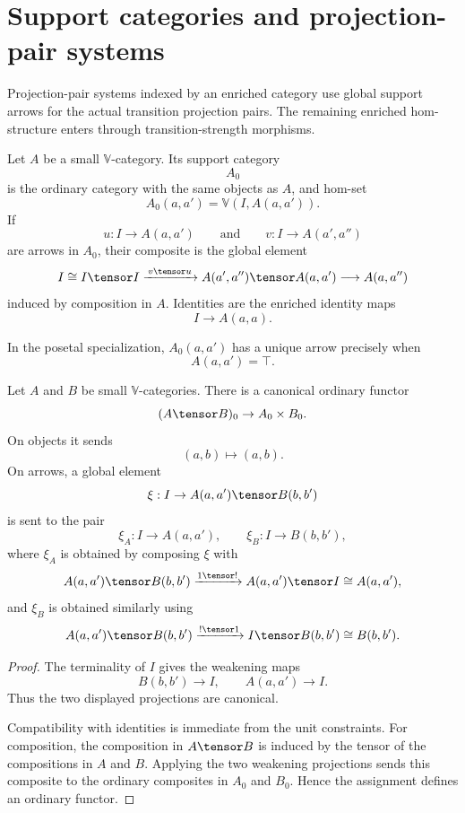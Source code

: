 \section{Support categories and projection-pair systems}
\label{sec:support-categories-split-systems}

Projection-pair systems indexed by an enriched category use global support
arrows for the actual transition projection pairs.  The remaining enriched
hom-structure enters through transition-strength morphisms.

\begin{definition}
\label{def:support-category-enriched-index}
Let \(A\) be a small \(\mathbb V\)-category.  Its support category
\[
    A_0
\]
is the ordinary category with the same objects as \(A\), and hom-set
\[
    A_0(a,a')=\mathbb V(I,A(a,a')).
\]
If
\[
    u:I\to A(a,a')
    \qquad\text{and}\qquad
    v:I\to A(a',a'')
\]
are arrows in \(A_0\), their composite is the global element
\[
    I\cong I\tensor I
    \xrightarrow{\,v\tensor u\,}
    A(a',a'')\tensor A(a,a')
    \longrightarrow
    A(a,a'')
\]
induced by composition in \(A\).  Identities are the enriched identity maps
\[
    I\to A(a,a).
\]

In the posetal specialization, \(A_0(a,a')\) has a unique arrow precisely when
\[
    A(a,a')=\top.
\]
\end{definition}

\begin{lemma}
\label{lem:support-projections-tensor-product}
Let \(A\) and \(B\) be small \(\mathbb V\)-categories.  There is a canonical
ordinary functor
\[
    (A\tensor B)_0\to A_0\times B_0.
\]
On objects it sends
\[
    (a,b)\longmapsto(a,b).
\]
On arrows, a global element
\[
    \xi:I\to A(a,a')\tensor B(b,b')
\]
is sent to the pair
\[
    \xi_A:I\to A(a,a'),
    \qquad
    \xi_B:I\to B(b,b'),
\]
where \(\xi_A\) is obtained by composing \(\xi\) with
\[
    A(a,a')\tensor B(b,b')
    \xrightarrow{1\tensor !}
    A(a,a')\tensor I
    \cong
    A(a,a'),
\]
and \(\xi_B\) is obtained similarly using
\[
    A(a,a')\tensor B(b,b')
    \xrightarrow{!\tensor 1}
    I\tensor B(b,b')
    \cong
    B(b,b').
\]
\end{lemma}

\begin{proof}
The terminality of \(I\) gives the weakening maps
\[
    B(b,b')\to I,
    \qquad
    A(a,a')\to I.
\]
Thus the two displayed projections are canonical.

Compatibility with identities is immediate from the unit constraints.  For
composition, the composition in \(A\tensor B\) is induced by the tensor of the
compositions in \(A\) and \(B\).  Applying the two weakening projections sends
this composite to the ordinary composites in \(A_0\) and \(B_0\).  Hence the
assignment defines an ordinary functor.
\end{proof}

